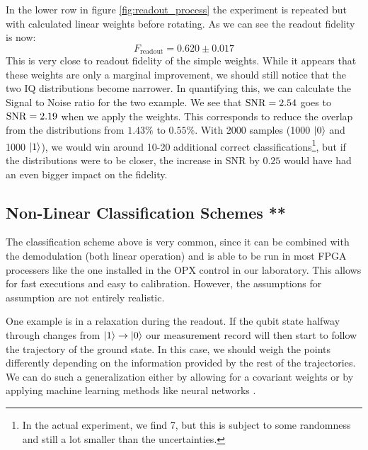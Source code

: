 In the lower row in figure \ref{fig:readout_process} the experiment is repeated but with calculated linear weights before rotating. As we can see the readout fidelity is now:
\begin{equation}
    F_{\text{readout}} = 0.620 \pm 0.017
\end{equation}
This is very close to readout fidelity of the simple weights. While it appears that these weights are only a marginal improvement, we should still notice that the two IQ distributions become narrower. In quantifying this, we can calculate the Signal to Noise ratio for the two example. We see that $\operatorname{SNR} = 2.54$ goes to $\operatorname{SNR} = 2.19$ when we apply the weights. This corresponds to reduce the overlap from the distributions from $1.43\%$ to $0.55\%$. With 2000 samples (1000 $\ket{0}$ and 1000 $\ket{1}$), we would win around 10-20 additional correct classifications\footnote{In the actual experiment, we find 7, but this is subject to some randomness and still a lot smaller than the uncertainties.}, but if the distributions were to be closer, the increase in SNR by $0.25$ would have had an even bigger impact on the fidelity.


\subsection{Non-Linear Classification Schemes ** }
The classification scheme above is very common, since it can be combined with the demodulation (both linear operation) and is able to be run in most FPGA processers like the one installed in the OPX control in our laboratory. This allows for fast executions and easy to calibration. However, the assumptions for assumption are not entirely realistic. 

One example is in a relaxation during the readout. If the qubit state halfway through changes from $\ket{1}\to \ket{0}$ our measurement record will then start to follow the trajectory of the ground state. In this case, we should weigh the points differently depending on the information provided by the rest of the trajectories. We can do such a generalization either by allowing for a covariant weights\cite{gambetta_protocols_2007} or by applying machine learning methods like neural networks \cite{Lienhardt}.




